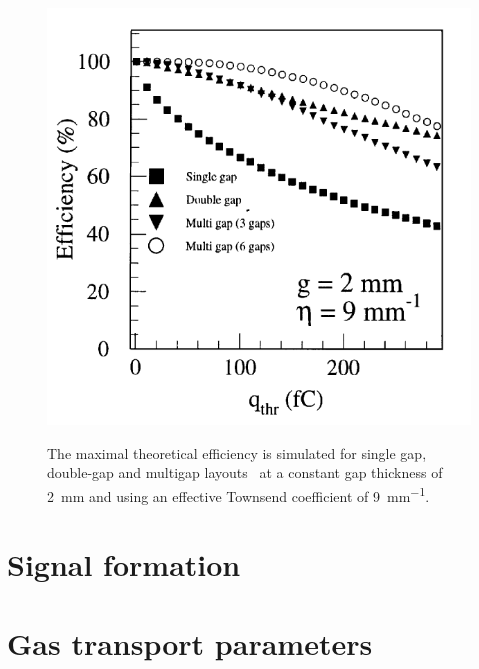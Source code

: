 	\begin{figure}[H]
		\centering
		\includegraphics[width = 0.6\plotwidth]{fig/chapt3/Layout_eff_vs_thr.png}\\
		\caption{\label{fig:EffThreshold} The maximal theoretical efficiency is simulated for single gap, double-gap and multigap layouts~\cite{ABBRESCIA99} at a constant gap thickness of \SI{2}{mm} and using an effective Townsend coefficient of \SI{9}{mm^{-1}}.}
	\end{figure}

\section{Signal formation}
\label{chapt3:sec:signal}

\section{Gas transport parameters}
\label{chapt3:sec:transport}



\clearpage{\pagestyle{empty}\cleardoublepage}
